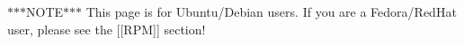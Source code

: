 $\ast$$\ast$$\ast$\-N\-O\-T\-E$\ast$$\ast$$\ast$ This page is for Ubuntu/\-Debian users. If you are a Fedora/\-Red\-Hat user, please see the \mbox{[}\mbox{[}R\-P\-M\mbox{]}\mbox{]} section! 